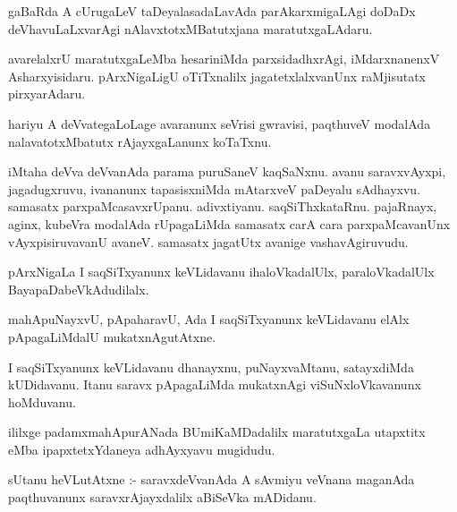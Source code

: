 \documentclass{article}
\begin{document}
\begin{mn}
gaBaRda A cUrugaLeV taDeyalasadaLavAda parAkarxmigaLAgi doDaDx deVhavuLaLxvarAgi 
nAlavxtotxMBatutxjana maratutxgaLAdaru.
\end{mn}

\begin{mn}
avarelalxrU maratutxgaLeMba hesariniMda parxsidadhxrAgi, iMdarxnanenxV 
Asharxyisidaru.  pArxNigaLigU  oTiTxnalilx jagatetxlalxvanUnx raMjisutatx pirxyarAdaru.
\end{mn}

\begin{mn}
hariyu A deVvategaLoLage avaranunx seVrisi gwravisi, paqthuveV modalAda 
nalavatotxMbatutx rAjayxgaLanunx koTaTxnu.
\end{mn}

\begin{mn}
iMtaha deVva deVvanAda parama puruSaneV kaqSaNxnu. avanu saravxvAyxpi, jagadugxruvu, 
ivananunx tapasisxniMda mAtarxveV paDeyalu sAdhayxvu. samasatx parxpaMcasavxrUpanu.  
adivxtiyanu.  saqSiThxkataRnu. pajaRnayx, aginx, kubeVra modalAda rUpagaLiMda 
samasatx carA cara parxpaMcavanUnx vAyxpisiruvavanU avaneV.  samasatx 
jagatUtx avanige vashavAgiruvudu.
\end{mn}

\begin{mn}
pArxNigaLa I saqSiTxyanunx keVLidavanu ihaloVkadalUlx, paraloVkadalUlx BayapaDabeVkAdudilalx.
\end{mn}

\begin{mn}
mahApuNayxvU, pApaharavU, Ada I saqSiTxyanunx keVLidavanu elAlx pApagaLiMdalU mukatxnAgutAtxne.
\end{mn}

\begin{mn}
I saqSiTxyanunx keVLidavanu dhanayxnu,  puNayxvaMtanu, satayxdiMda kUDidavanu.  
Itanu saravx pApagaLiMda mukatxnAgi viSuNxloVkavanunx hoMduvanu. 
\end{mn}

\begin{mn}
ililxge padamxmahApurANada BUmiKaMDadalilx  maratutxgaLa utapxtitx eMba ipapxtetxYdaneya adhAyxyavu mugidudu.
\end{mn}




\begin{mn}
sUtanu heVLutAtxne :- saravxdeVvanAda A sAvmiyu  veVnana maganAda paqthuvanunx saravxrAjayxdalilx aBiSeVka mADidanu.
\end{mn}
\end{document}
